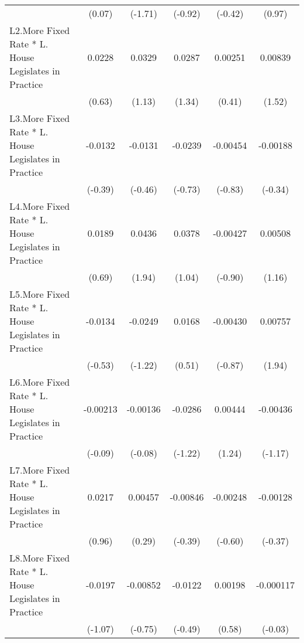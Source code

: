 {\begin{longtable}{l*{5}{c}}
                &   (0.07)         &  (-1.71)         &  (-0.92)         &  (-0.42)         &   (0.97)         \\
[1em]
L2.More Fixed Rate * L. House Legislates in Practice&   0.0228         &   0.0329         &   0.0287         &  0.00251         &  0.00839         \\
                &   (0.63)         &   (1.13)         &   (1.34)         &   (0.41)         &   (1.52)         \\
[1em]
L3.More Fixed Rate * L. House Legislates in Practice&  -0.0132         &  -0.0131         &  -0.0239         & -0.00454         & -0.00188         \\
                &  (-0.39)         &  (-0.46)         &  (-0.73)         &  (-0.83)         &  (-0.34)         \\
[1em]
L4.More Fixed Rate * L. House Legislates in Practice&   0.0189         &   0.0436         &   0.0378         & -0.00427         &  0.00508         \\
                &   (0.69)         &   (1.94)         &   (1.04)         &  (-0.90)         &   (1.16)         \\
[1em]
L5.More Fixed Rate * L. House Legislates in Practice&  -0.0134         &  -0.0249         &   0.0168         & -0.00430         &  0.00757         \\
                &  (-0.53)         &  (-1.22)         &   (0.51)         &  (-0.87)         &   (1.94)         \\
[1em]
L6.More Fixed Rate * L. House Legislates in Practice& -0.00213         & -0.00136         &  -0.0286         &  0.00444         & -0.00436         \\
                &  (-0.09)         &  (-0.08)         &  (-1.22)         &   (1.24)         &  (-1.17)         \\
[1em]
L7.More Fixed Rate * L. House Legislates in Practice&   0.0217         &  0.00457         & -0.00846         & -0.00248         & -0.00128         \\
                &   (0.96)         &   (0.29)         &  (-0.39)         &  (-0.60)         &  (-0.37)         \\
[1em]
L8.More Fixed Rate * L. House Legislates in Practice&  -0.0197         & -0.00852         &  -0.0122         &  0.00198         &-0.000117         \\
                &  (-1.07)         &  (-0.75)         &  (-0.49)         &   (0.58)         &  (-0.03)         \\

\end{longtable}}
